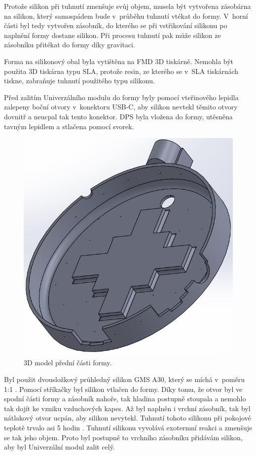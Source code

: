 Protože silikon při tuhnutí zmenšuje svůj objem, musela být vytvořena zásobárna na silikon, který samospádem bude v~průběhu tuhnutí vtékat do formy. V~horní části byl tedy vytvořen zásobník, do kterého 
se při vstřikování silikonu po naplnění formy dostane silikon. Při procesu tuhnutí pak může silikon ze zásobníku přitékat do formy díky gravitaci. 

Forma na silikonový obal byla vytištěna na FMD 3D tiskárně. Nemohla být použita 3D tiskárna typu SLA, protože resin, ze kterého se v~SLA tiskárnách tiskne, zabraňuje tuhnutí použitého typu silikonu. 

Před zalitím Univerzálního modulu do formy byly pomocí vteřinového lepidla zalepeny boční otvory v~konektoru USB-C, aby silikon nevtekl těmito otvory dovnitř a neucpal tak tento konektor. DPS byla 
vložena do formy, utěsněna tavným lepidlem a stlačena pomocí svorek.

\begin{figure}[!h]
  \begin{center}
    \includegraphics[scale=0.4]{obrazky/forma_predni.jpg}
  \end{center}
  \caption[3D model přední části formy]{3D model přední části formy.}
\end{figure}

Byl použit dvousložkový průhledný silikon GMS A30, který se míchá v~poměru 1:1 \cite{silikon}. Pomocí stříkačky byl silikon vtlačen do formy. Díky tomu, že otvor byl ve spodní části formy a zásobník 
nahoře, tak hladina postupně stoupala a nemohlo tak dojít ke vzniku vzduchových kapes. Až byl naplněn i vrchní zásobník, tak byl nátlakový otvor ucpán, aby silikon nevytekl. Tuhnutí tohoto silikonu 
při pokojové teplotě trvalo asi 5 hodin \cite{silikon}. Tuhnutí silikonu vyvolává exotermní reakci a zmenšuje se tak jeho objem. Proto byl postupně to vrchního zásobníku přidávám silikon, aby byl 
Univerzální modul zalit celý. 

